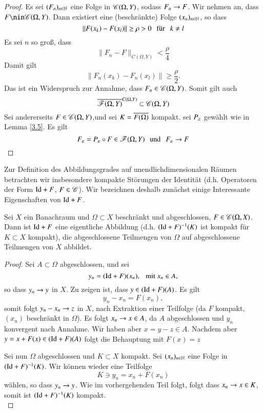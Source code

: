 \begin{proof}
    Es sei $(F_n)_{n\in \mathbb{N}}$ eine Folge in $\mathscr C(\Omega,Y)$, sodass  $F_n\rightarrow F$. Wir nehmen an, dass
    $F\nin \ms C(\Omega,Y)$. Dann existiert eine (beschränkte) Folge $(x_n)_{n\in \mathbb{N}}$, so dass
    \[
        \|F(x_k)-F(x_l)\|\geq \rho>0 \hspace{.25cm}\text{für}\hspace{.25cm} k\neq l
    \]
    Es sei $n$ so groß, dass
    \[
        \|F_n-F\|_{ C(\Omega,Y)}<\frac{\rho}{4}
    \]
    Damit gilt
    \[
        \|F_n(x_k)-F_n(x_l)\|\geq \frac\rho2.
    \]
    Das ist ein Widerspruch zur Annahme, dass $F_n\in \mathscr C(\Omega,Y)$. Somit gilt auch
    \[
        \overline{\mathscr F(\Omega,Y)}^{C(\Omega,Y)}\subset \mathscr C(\Omega,Y)
    \]
    Sei andererseits $F\in \mathscr C(\Omega,Y)$,und sei $K=\overline{F(\Omega)}$ kompakt. sei $P_\varepsilon$ gewählt wie
    in Lemma \ref{3.5}. Es gilt
    \[
        F_\varepsilon=P_\varepsilon\circ F\in \mathscr F(\Omega,Y) \hspace{.25cm} \text{und}\hspace{.25cm} F_\varepsilon\rightarrow F
    \]
\end{proof}

Zur Definition des Abbildungsgrades auf unendlichdimensionalen Räumen betrachten wir insbesondere
kompakte Störungen der Identität (d.h. Operatoren der Form $\mathrm{Id}+F$, $F\in \mathscr C$). Wir bezeichnen deshalb
zunächst einige Interessante Eigenschaften von $\mathrm{Id}+F$.

\begin{lem}\label{3.7}
    Sei $X$ ein Banachraum und $\Omega\subset X$ beschränkt und abgeschlossen, $F\in \mathscr C(\Omega,X)$.
    Dann ist $\mathrm{Id} + F$ eine eigentliche Abbildung (d.h. $(\mathrm{Id}+F)^{-1}(K)$ ist kompakt für $K\subset X$ 
    kompakt), die abgeschlossene Teilmengen von $\Omega$ auf abgeschlossene Teilmengen von $X$ abbildet.
\end{lem}

\begin{proof}
    Sei $A\subset \Omega$ abgeschlossen, und sei
    \[
        y_n=(\mathrm{Id}+F)(x_n), \hspace{.25cm} \text{mit } x_n \in A,
    \]
    so dass $y_n \rightarrow y$ in $X$. Zu zeigen ist, dass $y\in (\mathrm{Id}+F)(A)$. Es gilt
    \[
        y_n-x_n=F(x_n),
    \]
    somit folgt $y_n-x_n\rightarrow z$ in $X$, nach Extraktion einer Teilfolge (da $F$ kompakt, $(x_n)$
    beschränkt in $\Omega$). Es folgt $x_n\rightarrow x \in A$, da $A$ abgeschlossen und $y_n$ konvergent
    nach Annahme. Wir haben aber $x=y-z\in A$. Nachdem aber $y=x+F(x)\in (\mathrm{Id}+F)(A)$ folgt die Behauptung
    mit $F(x)=z$

    Sei nun $\Omega$ abgeschlossen und $K\subset X$ kompakt. Sei $(x_n)_{n\in \mathbb{N}}$ eine Folge in
    $(\mathrm{Id}+F)^{-1}(K)$. Wir können wieder eine Teilfolge
    \[
        K\ni y_n=x_n+F(x_n)
    \]
    wählen, so dass $y_n\rightarrow y$. Wie im vorhergehenden Teil folgt, folgt dass $x_n\rightarrow x\in K$, somit ist
    $(\mathrm{Id}+F)^{-1}(K)$ kompakt.
    \[ \]
\end{proof}

